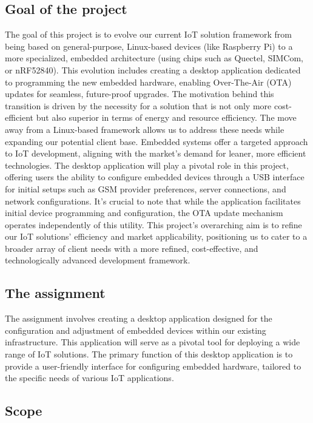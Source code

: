 \documentclass[a4paper, 11pt]{article}
\begin{document}
\subsection{Goal of the project}
The goal of this project is to evolve our current IoT solution framework from being based on general-purpose, Linux-based devices (like Raspberry Pi) to a more specialized, embedded architecture (using chips such as Quectel, SIMCom, or nRF52840). This evolution includes creating a desktop application dedicated to programming the new embedded hardware, enabling Over-The-Air (OTA) updates for seamless, future-proof upgrades.
\smallbreak
The motivation behind this transition is driven by the necessity for a solution that is not only more cost-efficient but also superior in terms of energy and resource efficiency. The move away from a Linux-based framework allows us to address these needs while expanding our potential client base. Embedded systems offer a targeted approach to IoT development, aligning with the market's demand for leaner, more efficient technologies.
\smallbreak
The desktop application will play a pivotal role in this project, offering users the ability to configure embedded devices through a USB interface for initial setups such as GSM provider preferences, server connections, and network configurations. It's crucial to note that while the application facilitates initial device programming and configuration, the OTA update mechanism operates independently of this utility.
\smallbreak
This project's overarching aim is to refine our IoT solutions' efficiency and market applicability, positioning us to cater to a broader array of client needs with a more refined, cost-effective, and technologically advanced development framework.

\subsection{The assignment}
The assignment involves creating a desktop application designed for the configuration and adjustment of embedded devices within our existing infrastructure. This application will serve as a pivotal tool for deploying a wide range of IoT solutions. The primary function of this desktop application is to provide a user-friendly interface for configuring embedded hardware, tailored to the specific needs of various IoT applications.

\subsection{Scope}
\end{document}
